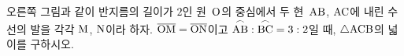 \noindent\begin{minipage}[t]{0.58\linewidth}\vspace{0pt}\raggedright 오른쪽 그림과 같이 반지름의 길이가 $2$인 원~$\mathrm{O}$의 중심에서 두 현~$\mathrm{AB}$, $\mathrm{AC}$에 내린 수선의 발을 각각 $\mathrm{M}$, $\mathrm{N}$이라 하자. $\overline{\mathrm{OM}}=\overline{\mathrm{ON}}$이고 $\overset{\frown}{\mathrm{AB}}:\overset{\frown}{\mathrm{BC}}=3:2$일 때, $\triangle\mathrm{ACB}$의 넓이를 구하시오.\end{minipage}\hfill\begin{minipage}[t]{0.4\linewidth}\vspace{0pt}\centering \resizebox{\ifdim\width>\linewidth\linewidth\else\width\fi}{!}{}\end{minipage}\par
